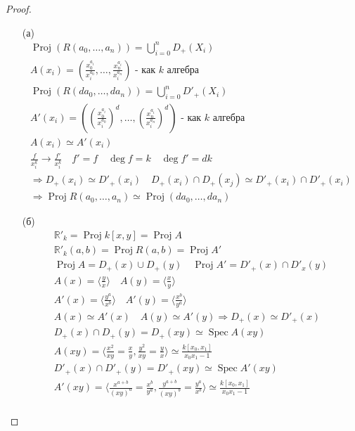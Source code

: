 \begin{proof}
\begin{itemize}
\item[(а)]
	\begin{gather*}
		\operatorname{Proj}(R(a_0, \ldots, a_n)) = \bigcup_{i=0}^{n} D_+(X_i)\\
		A(x_i) = \left(\frac{x_0^{a_i}}{x_i^{a_0}}, \ldots, \frac{x_n^{a_i}}{x_i^{a_n}}\right) \text{ - как $k$ алгебра}\\
		\operatorname{Proj}(R(da_0, \ldots, da_n)) = \bigcup_{i=0}^{n} D'_+(X_i)\\
		A'(x_i) = \left(\left(\frac{x_0^{a_i}}{x_i^{a_0}}\right)^d, \ldots, \left(\frac{x_n^{a_i}}{x_i^{a_n}}\right)^d\right) \text{ - как $k$ алгебра}\\
		A(x_i) \simeq A'(x_i)\\
		\frac{f}{x_i^k} \to \frac{f'}{x_i^k}\quad f'=f\quad \deg f = k\quad \deg f'= dk\\
		\Rightarrow D_+(x_i) \simeq D'_+(x_i)\quad D_+(x_i) \cap D_+(x_j) \simeq D'_+(x_i) \cap D'_+(x_i)\\
		\Rightarrow \operatorname{Proj} R(a_0, \ldots, a_n) \simeq \operatorname{Proj}(da_0, \ldots, da_n)
	\end{gather*}
\item[(б)]
	\begin{gather*}
		\mathbb{R}'_k = \operatorname{Proj} k[x,y] = \operatorname{Proj} A\\
		\mathbb{R}'_k (a,b) = \operatorname{Proj} R(a,b) = \operatorname{Proj} A'\\
		\operatorname{Proj} A = D_+(x) \cup D_+(y)\quad \operatorname{Proj} A' = D'_+(x) \cap D'_x(y)\\
		A(x) = \langle \frac{y}{x} \rangle\quad A(y) = \langle \frac{x}{y} \rangle\\
		A'(x) = \langle \frac{y^a}{x^b} \rangle\quad A'(y) = \langle \frac{x^b}{y^a} \rangle\\
		A(x) \simeq A'(x)\quad A(y) \simeq A'(y) \Rightarrow D_+(x) \simeq D'_+(x)\\
		D_+(x) \cap D_+(y) = D_+(xy) \simeq \operatorname{Spec} A(xy)\\
		A(xy) = \langle \frac{x^2}{xy} = \frac{x}{y}, \frac{y^2}{xy} = \frac{y}{x} \rangle \simeq \frac{k[x_0, x_1]}{x_0 x_1 - 1}\\
		D'_+(x) \cap D'_+(y) = D'_+(xy) \simeq \operatorname{Spec} A'(xy)\\
		A'(xy) = \langle \frac{x^{a+b}}{(xy)^a} = \frac{x^b}{y^a}, \frac{y^{a+b}}{(xy)^b} = \frac{y^a}{x^b} \rangle \simeq \frac{k[x_0, x_1]}{x_0 x_1 - 1}\\

\end{gather*}
\end{itemize}
\end{proof}
